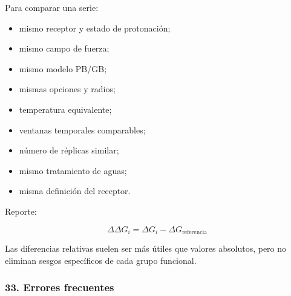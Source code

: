 \documentclass[
  spanish,
  11pt,
  a4paper]{article}
\providecommand{\tightlist}{%
  \setlength{\itemsep}{0pt}\setlength{\parskip}{0pt}}
\begin{document}
Para comparar una serie:

\begin{itemize}
\tightlist
\item
  mismo receptor y estado de protonación;
\item
  mismo campo de fuerza;
\item
  mismo modelo PB/GB;
\item
  mismas opciones y radios;
\item
  temperatura equivalente;
\item
  ventanas temporales comparables;
\item
  número de réplicas similar;
\item
  mismo tratamiento de aguas;
\item
  misma definición del receptor.
\end{itemize}

Reporte:

\[
\Delta\Delta G_i
=
\Delta G_i-
\Delta G_{\mathrm{referencia}}
\]

Las diferencias relativas suelen ser más útiles que valores absolutos,
pero no eliminan sesgos específicos de cada grupo funcional.

\subsubsection{33. Errores frecuentes}\label{errores-frecuentes-2}
\end{document}
